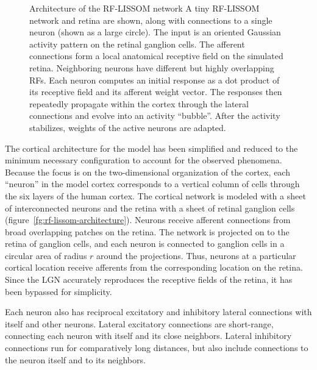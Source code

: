 \documentclass[10pt]{article}   %
\begin{document}
\begin{figure}
  \centering
  \begin{minipage}{\oneplotwidth}
    \vspace{0.1in} %
    \centering
  \end{minipage}
  {Architecture of the RF-LISSOM network}
  {A tiny RF-LISSOM network and retina are shown, along with
    connections to a single neuron (shown as a large circle).  The
    input is an oriented Gaussian activity pattern on the retinal
    ganglion cells.  The afferent connections form a local anatomical
    receptive field on the simulated retina.  Neighboring neurons have
    different but highly overlapping RFs.  Each neuron computes an
    initial response as a dot product of its receptive field and its
    afferent weight vector. The responses then repeatedly propagate
    within the cortex through the lateral connections and evolve into
    an activity ``bubble''. After the activity stabilizes, weights of
    the active neurons are adapted. 
    }
  \vspace{-0.1in} %
\end{figure}

The cortical architecture for the model has been simplified and
reduced to the minimum necessary configuration to account for the
observed phenomena.  Because the focus is on the two-dimensional
organization of the cortex, each ``neuron'' in the model cortex
corresponds to a vertical column of cells through the six layers of
the human cortex.  
The cortical network is modeled with a sheet of interconnected neurons
and the retina with a sheet of retinal ganglion cells
(figure~\ref{fg:rf-lissom-architecture}).  Neurons receive afferent
connections from broad overlapping patches on the retina. The 
 network is projected on to the retina of 
ganglion cells, and each neuron is connected to ganglion cells in a
circular area of radius $r$ around the projections. Thus, neurons at a
particular cortical location receive afferents from the corresponding
location on the retina.  Since the LGN accurately reproduces the
receptive fields of the retina, it has been bypassed for simplicity.

Each neuron also has reciprocal excitatory and inhibitory lateral
connections with itself and other neurons.  Lateral excitatory
connections are short-range, connecting each neuron with itself and
its close neighbors.  Lateral inhibitory connections run for
comparatively long distances, but also include connections to the
neuron itself and to its neighbors.
\end{document}
